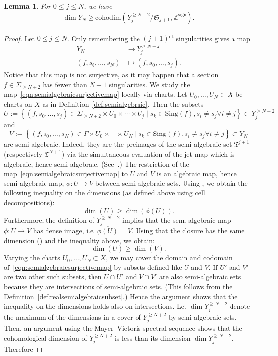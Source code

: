 \documentclass[a4paper]{amsart}
\newcommand{\bZ}{\mathbb Z}
\newcommand{\fT}{\mathfrak T}
\newcommand{\lra}{\longrightarrow}
\newcommand{\fS}{\mathfrak S}
\theoremstyle{plain}
\newtheorem{lemma}[theorem]{Lemma}
\theoremstyle{definition}
\newcommand{\cohodim}{\mathrm{cohodim}}
\begin{document}
\begin{lemma}\label{lemma:crucialestimationlemma}
For $0 \leq j \leq N$, we have
\[
    \dim Y_N \geq \cohodim\left(Y_j^{\geq N+2} / \fS_{j+1}, \bZ^\mathrm{sign} \right).
\]
\end{lemma}
\begin{proof}
Let $0 \leq j \leq N$. Only remembering the $(j+1)$\textsuperscript{st} singularities gives a map
\begin{equation}\label{eqn:semialgebraicsurjectivemap}
\begin{split}
    Y_N &\lra Y_j^{\geq N+2} \\
    (f,s_0,\ldots,s_N) &\longmapsto (f, s_0,\ldots,s_j).
\end{split}
\end{equation}
Notice that this map is not surjective, as it may happen that a section $f \in \overline{\Sigma_{\geq N+2}}$ has fewer than $N+1$ singularities. We study the map~\eqref{eqn:semialgebraicsurjectivemap} locally via charts. Let $U_0, \ldots, U_N \subset X$ be charts on $X$ as in Definition~\ref{def:semialgebraic}. Then the subsets 
\[
    U := \left\{ (f,s_0,\ldots,s_j) \in \overline{\Sigma_{\geq N+2}} \times U_0 \times \cdots \times U_j \mid s_k \in \mathrm{Sing}(f), s_i \neq s_j \forall i\neq j \right\} \subset Y_j^{\geq N+2}
\]
and
\[
    V := \left\{ (f,s_0,\ldots,s_N) \in \Gamma \times U_0 \times \cdots \times U_N \mid s_k \in \mathrm{Sing}(f), s_i \neq s_j \forall i\neq j \right\} \subset Y_N
\]
are semi-algebraic. Indeed, they are the preimages of the semi-algebraic set $\fT^{j+1}$ (respectively $\fT^{N+1}$) via the simultaneous evaluation of the jet map which is algebraic, hence semi-algebraic. (See~\cite[Proposition 2.2.7]{bochnak_real_1998}.) The restriction of the map~\eqref{eqn:semialgebraicsurjectivemap} to $U$ and $V$ is an algebraic map, hence semi-algebraic map, $\phi \colon U \to V$ between semi-algebraic sets. Using \cite[Theorem 2.8.8]{bochnak_real_1998}, we obtain the following inequality on the dimensions (as defined above using cell decompositions):
\[
    \dim(U) \geq \dim(\phi(U)).
\]
Furthermore, the definition of $Y_j^{\geq N+2}$ implies that the semi-algebraic map $\phi \colon U \to V$ has dense image, i.e. $\overline{\phi(U)} = V$. Using that the closure has the same dimension (\cite[Proposition 2.8.2]{bochnak_real_1998}) and the inequality above, we obtain:
\[
    \dim(U) \geq \dim(V).
\]
Varying the charts $U_0,\ldots,U_N \subset X$, we may cover the domain and codomain of~\eqref{eqn:semialgebraicsurjectivemap} by subsets defined like $U$ and $V$. If $U'$ and $V'$ are two other such subsets, then $U \cap U'$ and $V \cap V'$ are also semi-algebraic sets because they are intersections of semi-algebraic sets. (This follows from the Definition~\ref{def:realsemialgebraicsubset}.) Hence the argument shows that the inequality on the dimensions holds also on intersections. Let $\dim Y_j^{\geq N+2}$ denote the maximum of the dimensions in a cover of $Y_j^{\geq N+2}$ by semi-algebraic sets. Then, an argument using the Mayer--Vietoris spectral sequence shows that the cohomological dimension of $Y_j^{\geq N+2}$ is less than its dimension $\dim Y_j^{\geq N+2}$. Therefore

\end{proof}
\end{document}
